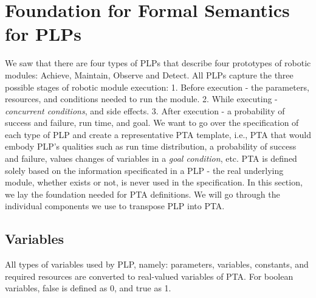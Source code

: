 \chapter{Foundation for Formal Semantics for PLPs \label{foundation_for_formal_semantics_for_plps}}
We saw that there are four types of PLPs that describe four prototypes of robotic modules: Achieve, Maintain, Observe and Detect. All PLPs capture the three possible stages of robotic module execution: 1. Before execution - the parameters, resources, and conditions needed to run the module. 2. While executing - \textit{concurrent conditions}, and side effects. 3. After execution - a probability of success and failure, run time, and goal. We want to go over the specification of each type of PLP and create a representative PTA template, i.e., PTA that would embody PLP’s qualities such as run time distribution, a probability of success and failure, values changes of variables in a \textit{\textit{goal condition}}, etc. PTA is defined solely based on the information specificated in a PLP - the real underlying module, whether exists or not, is never used in the specification. In this section, we lay the foundation needed for PTA definitions. We will go through the individual components we use to transpose PLP into PTA.\\
\section{Variables}
All types of variables used by PLP, namely: parameters, variables, constants, and required resources are converted to real-valued variables of PTA. For boolean variables, false is defined as 0, and true as 1.\\
